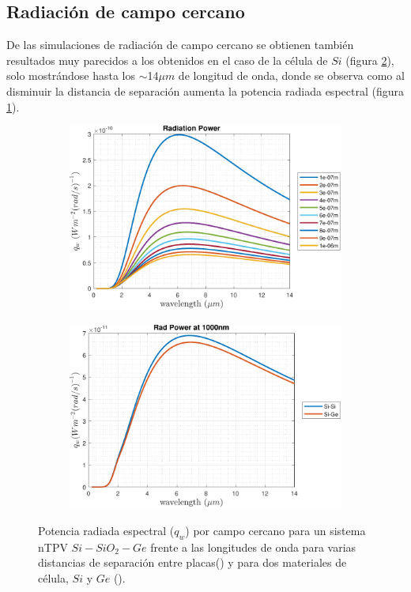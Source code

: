 \subsection{Radiación de campo cercano}
De las simulaciones de radiación de campo cercano se obtienen también resultados muy parecidos a los obtenidos en el caso de la célula de $Si$ (figura \ref{fig:SiSi_vs_SiGe}), solo mostrándose hasta los $\sim$14$\mu m$ de longitud de onda, donde se observa como al disminuir la distancia de separación aumenta la potencia radiada espectral (figura \ref{fig:rad_SiGe}).
\begin{figure}[H]
\centering
\begin{subfigure}[b]{0.49\textwidth}
	\centering
		\includegraphics[width=1.00\textwidth]{figuras/Resultados/radiacion/SiGe.pdf}
	\caption{ }
	\label{fig:rad_SiGe}
\end{subfigure}
\hfill
\begin{subfigure}[b]{0.49\textwidth}
	\centering
		\includegraphics[width=1.00\textwidth]{figuras/Resultados/radiacion/SiSi_vs_SiGe.pdf}
	\caption{ }
	\label{fig:SiSi_vs_SiGe}
\end{subfigure}
\caption{Potencia radiada espectral ($q_w$) por campo cercano para un sistema nTPV $Si-SiO_2-Ge$ frente a las longitudes de onda para varias distancias de separación entre placas() y para dos materiales de célula, $Si$ y $Ge$ ().}
\label{fig:rads_SiGe}
\end{figure}
